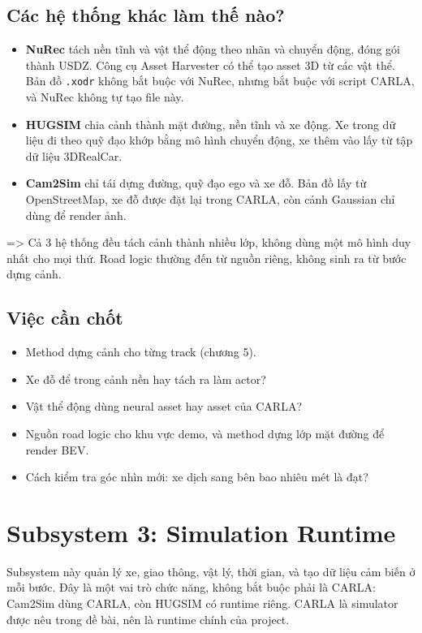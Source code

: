 \subsection{Các hệ thống khác làm thế nào?}

\begin{itemize}
  \item \textbf{NuRec} tách nền tĩnh và vật thể động theo nhãn và chuyển động, đóng gói thành USDZ. Công cụ Asset Harvester có thể tạo asset 3D từ các vật thể. Bản đồ \texttt{.xodr} không bắt buộc với NuRec, nhưng bắt buộc với script CARLA, và NuRec không tự tạo file này.
  \item \textbf{HUGSIM} chia cảnh thành mặt đường, nền tĩnh và xe động. Xe trong dữ liệu đi theo quỹ đạo khớp bằng mô hình chuyển động, xe thêm vào lấy từ tập dữ liệu 3DRealCar.
  \item \textbf{Cam2Sim} chỉ tái dựng đường, quỹ đạo ego và xe đỗ. Bản đồ lấy từ OpenStreetMap, xe đỗ được đặt lại trong CARLA, còn cảnh Gaussian chỉ dùng để render ảnh.
\end{itemize}

=> Cả 3 hệ thống đều tách cảnh thành nhiều lớp, không dùng một mô hình duy nhất cho mọi thứ. Road logic thường đến từ nguồn riêng, không sinh ra từ bước dựng cảnh.

\subsection{Việc cần chốt}

\begin{itemize}
  \item Method dựng cảnh cho từng track (chương 5).
  \item Xe đỗ để trong cảnh nền hay tách ra làm actor?
  \item Vật thể động dùng neural asset hay asset của CARLA?
  \item Nguồn road logic cho khu vực demo, và method dựng lớp mặt đường để render BEV.
  \item Cách kiểm tra góc nhìn mới: xe dịch sang bên bao nhiêu mét là đạt?
\end{itemize}

\section{Subsystem 3: Simulation Runtime}

Subsystem này quản lý xe, giao thông, vật lý, thời gian, và tạo dữ liệu cảm biến ở mỗi bước.
Đây là một vai trò chức năng, không bắt buộc phải là CARLA: Cam2Sim dùng CARLA, còn HUGSIM có runtime riêng.
CARLA là simulator được nêu trong đề bài, nên là runtime chính của project.

